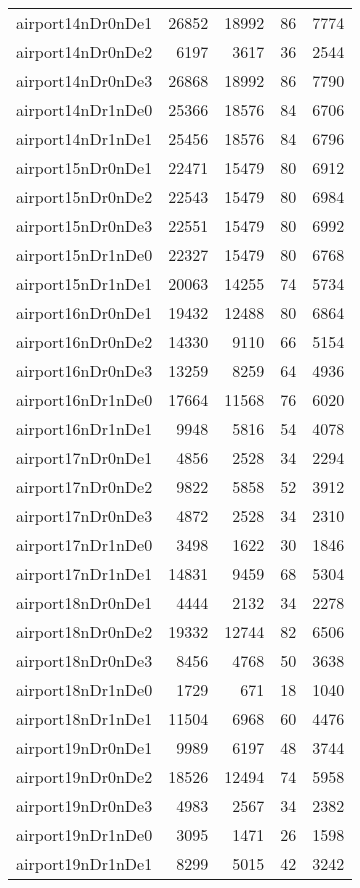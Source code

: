 \begin{longtable}{lrrrr}
airport14nDr0nDe1 & 26852 & 18992 & 86 & 7774 \\
airport14nDr0nDe2 & 6197 & 3617 & 36 & 2544 \\
airport14nDr0nDe3 & 26868 & 18992 & 86 & 7790 \\
airport14nDr1nDe0 & 25366 & 18576 & 84 & 6706 \\
airport14nDr1nDe1 & 25456 & 18576 & 84 & 6796 \\
airport15nDr0nDe1 & 22471 & 15479 & 80 & 6912 \\
airport15nDr0nDe2 & 22543 & 15479 & 80 & 6984 \\
airport15nDr0nDe3 & 22551 & 15479 & 80 & 6992 \\
airport15nDr1nDe0 & 22327 & 15479 & 80 & 6768 \\
airport15nDr1nDe1 & 20063 & 14255 & 74 & 5734 \\
airport16nDr0nDe1 & 19432 & 12488 & 80 & 6864 \\
airport16nDr0nDe2 & 14330 & 9110 & 66 & 5154 \\
airport16nDr0nDe3 & 13259 & 8259 & 64 & 4936 \\
airport16nDr1nDe0 & 17664 & 11568 & 76 & 6020 \\
airport16nDr1nDe1 & 9948 & 5816 & 54 & 4078 \\
airport17nDr0nDe1 & 4856 & 2528 & 34 & 2294 \\
airport17nDr0nDe2 & 9822 & 5858 & 52 & 3912 \\
airport17nDr0nDe3 & 4872 & 2528 & 34 & 2310 \\
airport17nDr1nDe0 & 3498 & 1622 & 30 & 1846 \\
airport17nDr1nDe1 & 14831 & 9459 & 68 & 5304 \\
airport18nDr0nDe1 & 4444 & 2132 & 34 & 2278 \\
airport18nDr0nDe2 & 19332 & 12744 & 82 & 6506 \\
airport18nDr0nDe3 & 8456 & 4768 & 50 & 3638 \\
airport18nDr1nDe0 & 1729 & 671 & 18 & 1040 \\
airport18nDr1nDe1 & 11504 & 6968 & 60 & 4476 \\
airport19nDr0nDe1 & 9989 & 6197 & 48 & 3744 \\
airport19nDr0nDe2 & 18526 & 12494 & 74 & 5958 \\
airport19nDr0nDe3 & 4983 & 2567 & 34 & 2382 \\
airport19nDr1nDe0 & 3095 & 1471 & 26 & 1598 \\
airport19nDr1nDe1 & 8299 & 5015 & 42 & 3242 \\

\end{longtable}
